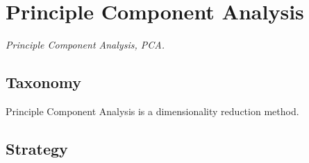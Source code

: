 
\section{Principle Component Analysis} 
\label{sec:pca}


\emph{Principle Component Analysis, PCA.}

\subsection{Taxonomy}
Principle Component Analysis is a dimensionality reduction method.

\subsection{Strategy}




